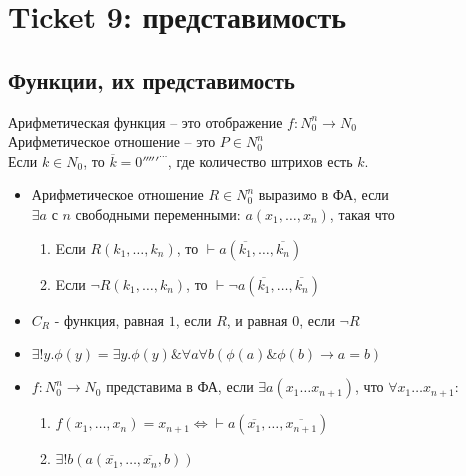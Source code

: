 \section{Ticket 9: представимость}
\label{sec-11}
\subsection{Функции, их представимость}
\label{sec-11-1}
Арифметическая функция -- это отображение $f: N_0^n \to N_0$ \\
Арифметическое отношение -- это $P \in N_0^n$ \\
Если $k \in N_0$, то $\overline k = 0'''''^\cdots$, где количество штрихов есть $k$.
\begin{itemize}
\item Арифметическое отношение $R \in N_0^n$ выразимо в ФА, если\\
$\exists a$ с $n$ свободными переменными:
$a(x_1,\dotsc, x_n)$, такая что
\begin{enumerate}
\item Eсли $R(k_1,\dotsc, k_n)$, то $\vdash a(\overline{k_1}, \dotsc, \overline{k_n})$
\item Eсли $\lnot R(k_1, \dotsc, k_n)$, то $\vdash \lnot a(\overline{k_1}, \dotsc, \overline{k_n})$
\end{enumerate}
\item $C_R$ - функция, равная $1$, если $R$, и равная $0$, если $\lnot R$
\item $\exists !y.\phi(y) = \exists y.\phi(y) \& \forall a\forall b(\phi(a) \& \phi(b) \to a = b)$
\item $f: N_0^n \to N_0$ представима в ФА, если $\exists a(x_1\ldots{}x_{n+1})$, что
$\forall x_1\dotsc x_{n+1}:$
\begin{enumerate}
\item $f(x_1, \dotsc, x_n) = x_{n+1} \Leftrightarrow \vdash a(\overline{x_1}, \dotsc, \overline{x_{n+1}})$
\item $\exists !b(a(\overline{x_1}, \dotsc, \overline{x_n}, b))$
\end{enumerate}
\end{itemize}
